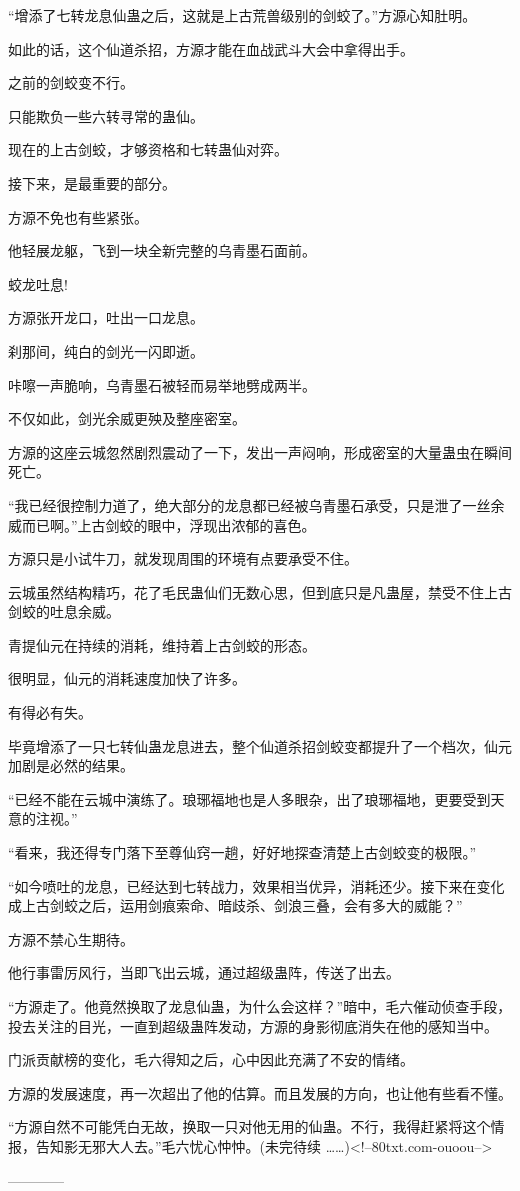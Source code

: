 \begin{this_body}
“增添了七转龙息仙蛊之后，这就是上古荒兽级别的剑蛟了。”方源心知肚明。

如此的话，这个仙道杀招，方源才能在血战武斗大会中拿得出手。

之前的剑蛟变不行。

只能欺负一些六转寻常的蛊仙。

现在的上古剑蛟，才够资格和七转蛊仙对弈。

接下来，是最重要的部分。

方源不免也有些紧张。

他轻展龙躯，飞到一块全新完整的乌青墨石面前。

蛟龙吐息!

方源张开龙口，吐出一口龙息。

刹那间，纯白的剑光一闪即逝。

咔嚓一声脆响，乌青墨石被轻而易举地劈成两半。

不仅如此，剑光余威更殃及整座密室。

方源的这座云城忽然剧烈震动了一下，发出一声闷响，形成密室的大量蛊虫在瞬间死亡。

“我已经很控制力道了，绝大部分的龙息都已经被乌青墨石承受，只是泄了一丝余威而已啊。”上古剑蛟的眼中，浮现出浓郁的喜色。

方源只是小试牛刀，就发现周围的环境有点要承受不住。

云城虽然结构精巧，花了毛民蛊仙们无数心思，但到底只是凡蛊屋，禁受不住上古剑蛟的吐息余威。

青提仙元在持续的消耗，维持着上古剑蛟的形态。

很明显，仙元的消耗速度加快了许多。

有得必有失。

毕竟增添了一只七转仙蛊龙息进去，整个仙道杀招剑蛟变都提升了一个档次，仙元加剧是必然的结果。

“已经不能在云城中演练了。琅琊福地也是人多眼杂，出了琅琊福地，更要受到天意的注视。”

“看来，我还得专门落下至尊仙窍一趟，好好地探查清楚上古剑蛟变的极限。”

“如今喷吐的龙息，已经达到七转战力，效果相当优异，消耗还少。接下来在变化成上古剑蛟之后，运用剑痕索命、暗歧杀、剑浪三叠，会有多大的威能？”

方源不禁心生期待。

他行事雷厉风行，当即飞出云城，通过超级蛊阵，传送了出去。

“方源走了。他竟然换取了龙息仙蛊，为什么会这样？”暗中，毛六催动侦查手段，投去关注的目光，一直到超级蛊阵发动，方源的身影彻底消失在他的感知当中。

门派贡献榜的变化，毛六得知之后，心中因此充满了不安的情绪。

方源的发展速度，再一次超出了他的估算。而且发展的方向，也让他有些看不懂。

“方源自然不可能凭白无故，换取一只对他无用的仙蛊。不行，我得赶紧将这个情报，告知影无邪大人去。”毛六忧心忡忡。(未完待续 ……)<!--80txt.com-ouoou-->

------------

\end{this_body}

